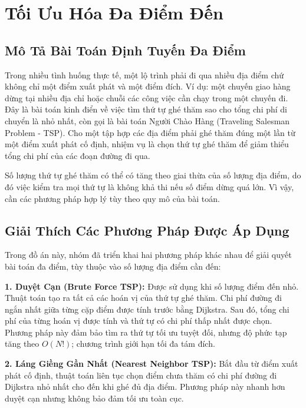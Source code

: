 
\chapter{Tối Ưu Hóa Đa Điểm Đến}
\label{chap:multilocation}

\section{Mô Tả Bài Toán Định Tuyến Đa Điểm}

Trong nhiều tình huống thực tế, một lộ trình phải đi qua nhiều địa điểm chứ không chỉ một điểm xuất phát và một điểm đích. Ví dụ: một chuyến giao hàng dừng tại nhiều địa chỉ hoặc chuỗi các công việc cần chạy trong một chuyến đi. Đây là bài toán kinh điển về việc tìm thứ tự ghé thăm sao cho tổng chi phí di chuyển là nhỏ nhất, còn gọi là bài toán Người Chào Hàng (Traveling Salesman Problem - TSP). Cho một tập hợp các địa điểm phải ghé thăm đúng một lần từ một điểm xuất phát cố định, nhiệm vụ là chọn thứ tự ghé thăm để giảm thiểu tổng chi phí của các đoạn đường đi qua.

Số lượng thứ tự ghé thăm có thể có tăng theo giai thừa của số lượng địa điểm, do đó việc kiểm tra mọi thứ tự là không khả thi nếu số điểm dừng quá lớn. Vì vậy, cần các phương pháp hợp lý tùy theo quy mô của bài toán.

\section{Giải Thích Các Phương Pháp Được Áp Dụng}

Trong đồ án này, nhóm đã triển khai hai phương pháp khác nhau để giải quyết bài toán đa điểm, tùy thuộc vào số lượng địa điểm cần đến:

\textbf{1. Duyệt Cạn (Brute Force TSP):} Được sử dụng khi số lượng điểm đến nhỏ. Thuật toán tạo ra tất cả các hoán vị của thứ tự ghé thăm. Chi phí đường đi ngắn nhất giữa từng cặp điểm được tính trước bằng Dijkstra. Sau đó, tổng chi phí của từng hoán vị được tính và thứ tự có chi phí thấp nhất được chọn. Phương pháp này đảm bảo tìm ra thứ tự tối ưu tuyệt đối, nhưng độ phức tạp tăng theo $O(N!)$; chương trình giới hạn tối đa tám đích.

\textbf{2. Láng Giềng Gần Nhất (Nearest Neighbor TSP):} Bắt đầu từ điểm xuất phát cố định, thuật toán liên tục chọn điểm chưa thăm có chi phí đường đi Dijkstra nhỏ nhất cho đến khi ghé đủ địa điểm. Phương pháp này nhanh hơn duyệt cạn nhưng không bảo đảm tối ưu toàn cục.

